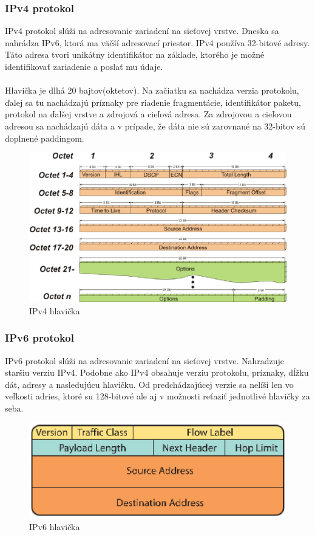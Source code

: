 \documentclass[10pt,a4paper,final]{article}
\begin{document}
\subsubsection{IPv4 protokol}
IPv4 protokol slúži na adresovanie zariadení na sieťovej vrstve. Dneska sa nahrádza IPv6, ktorá ma väčší adresovací priestor. IPv4 používa 32-bitové adresy. Táto adresa tvori unikátny identifikátor na základe, ktorého je možné identifikovať zariadenie a poslať mu údaje.
\\\\
Hlavička je dlhá 20 bajtov(oktetov). Na začiatku sa nachádza verzia protokolu, ďalej sa tu nachádzajú príznaky pre riadenie fragmentácie, identifikátor paketu, protokol na ďalšej vrstve a zdrojová a cieľová adresa. Za zdrojovou a cieľovou adresou sa nachádzajú dáta a v prípade, že dáta nie sú zarovnané na  32-bitov sú doplnené paddingom.\cite{ipv4-img}
\begin{figure}[H]
	\centering
	\includegraphics[scale=0.8, keepaspectratio]{images/ipv4.eps}
	\caption{IPv4 hlavička\cite{ipv4-img}}
\end{figure}

\subsubsection{IPv6 protokol}
IPv6 protokol slúži na adresovanie zariadení na sieťovej vrstve. Nahradzuje staršiu verziu IPv4. Podobne ako IPv4 obsahuje verziu protokolu, príznaky, dĺžku dát, adresy a nasledujúcu hlavičku. Od predchádzajúcej verzie sa nelíši len vo veľkosti adries, ktoré su 128-bitové ale aj v možnosti reťaziť jednotlivé hlavičky za seba.
\begin{figure}[H]
	\centering
	\includegraphics[scale=0.60, keepaspectratio]{images/ipv6.eps}
	\caption{IPv6 hlavička\cite{ipv6-img}}
\end{figure}
\end{document}
